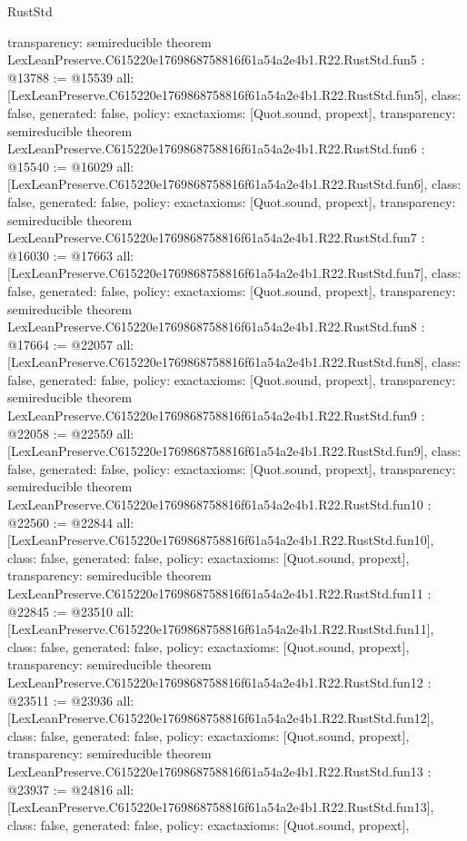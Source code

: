 \begin{lexlean}{RustStd}
\begin{coremodule}
{  transparency: semireducible
}
theorem LexLeanPreserve.C615220e1769868758816f61a54a2e4b1.R22.RustStd.fun5 : @13788 := @15539 {
  all: [LexLeanPreserve.C615220e1769868758816f61a54a2e4b1.R22.RustStd.fun5],
  class: false,
  generated: false,
  policy: exact{axioms: [Quot.sound, propext]},
  transparency: semireducible
}
theorem LexLeanPreserve.C615220e1769868758816f61a54a2e4b1.R22.RustStd.fun6 : @15540 := @16029 {
  all: [LexLeanPreserve.C615220e1769868758816f61a54a2e4b1.R22.RustStd.fun6],
  class: false,
  generated: false,
  policy: exact{axioms: [Quot.sound, propext]},
  transparency: semireducible
}
theorem LexLeanPreserve.C615220e1769868758816f61a54a2e4b1.R22.RustStd.fun7 : @16030 := @17663 {
  all: [LexLeanPreserve.C615220e1769868758816f61a54a2e4b1.R22.RustStd.fun7],
  class: false,
  generated: false,
  policy: exact{axioms: [Quot.sound, propext]},
  transparency: semireducible
}
theorem LexLeanPreserve.C615220e1769868758816f61a54a2e4b1.R22.RustStd.fun8 : @17664 := @22057 {
  all: [LexLeanPreserve.C615220e1769868758816f61a54a2e4b1.R22.RustStd.fun8],
  class: false,
  generated: false,
  policy: exact{axioms: [Quot.sound, propext]},
  transparency: semireducible
}
theorem LexLeanPreserve.C615220e1769868758816f61a54a2e4b1.R22.RustStd.fun9 : @22058 := @22559 {
  all: [LexLeanPreserve.C615220e1769868758816f61a54a2e4b1.R22.RustStd.fun9],
  class: false,
  generated: false,
  policy: exact{axioms: [Quot.sound, propext]},
  transparency: semireducible
}
theorem LexLeanPreserve.C615220e1769868758816f61a54a2e4b1.R22.RustStd.fun10 : @22560 := @22844 {
  all: [LexLeanPreserve.C615220e1769868758816f61a54a2e4b1.R22.RustStd.fun10],
  class: false,
  generated: false,
  policy: exact{axioms: [Quot.sound, propext]},
  transparency: semireducible
}
theorem LexLeanPreserve.C615220e1769868758816f61a54a2e4b1.R22.RustStd.fun11 : @22845 := @23510 {
  all: [LexLeanPreserve.C615220e1769868758816f61a54a2e4b1.R22.RustStd.fun11],
  class: false,
  generated: false,
  policy: exact{axioms: [Quot.sound, propext]},
  transparency: semireducible
}
theorem LexLeanPreserve.C615220e1769868758816f61a54a2e4b1.R22.RustStd.fun12 : @23511 := @23936 {
  all: [LexLeanPreserve.C615220e1769868758816f61a54a2e4b1.R22.RustStd.fun12],
  class: false,
  generated: false,
  policy: exact{axioms: [Quot.sound, propext]},
  transparency: semireducible
}
theorem LexLeanPreserve.C615220e1769868758816f61a54a2e4b1.R22.RustStd.fun13 : @23937 := @24816 {
  all: [LexLeanPreserve.C615220e1769868758816f61a54a2e4b1.R22.RustStd.fun13],
  class: false,
  generated: false,
  policy: exact{axioms: [Quot.sound, propext]},
}
\end{coremodule}
\end{lexlean}
